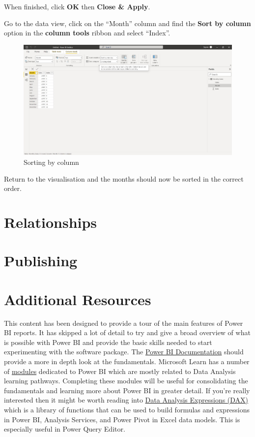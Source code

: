 \documentclass[
]{book}
\begin{document}
When finished, click \textbf{OK} then \textbf{Close \& Apply}.

Go to the data view, click on the ``Month'' column and find the \textbf{Sort by column} option in the \textbf{column tools} ribbon and select ``Index''.

\begin{figure}
\centering
\includegraphics{bi16.jpg}
\caption{Sorting by column}
\end{figure}

Return to the visualisation and the months should now be sorted in the correct order.

\hypertarget{relationships}{%
\section{Relationships}\label{relationships}}

\hypertarget{publishing}{%
\section{Publishing}\label{publishing}}

\hypertarget{additional-resources}{%
\section{Additional Resources}\label{additional-resources}}

This content has been designed to provide a tour of the main features of Power BI reports. It has skipped a lot of detail to try and give a broad overview of what is possible with Power BI and provide the basic skills needed to start experimenting with the software package. The \href{https://docs.microsoft.com/en-us/power-bi/fundamentals/}{Power BI Documentation} should provide a more in depth look at the fundamentals. Microsoft Learn has a number of \href{https://docs.microsoft.com/en-us/learn/modules/get-started-with-power-bi/}{modules} dedicated to Power BI which are mostly related to Data Analysis learning pathways. Completing these modules will be useful for consolidating the fundamentals and learning more about Power BI in greater detail. If you're really interested then it might be worth reading into \href{https://docs.microsoft.com/en-us/dax/}{Data Analysis Expressions (DAX)} which is a library of functions that can be used to build formulas and expressions in Power BI, Analysis Services, and Power Pivot in Excel data models. This is especially useful in Power Query Editor.
\end{document}
